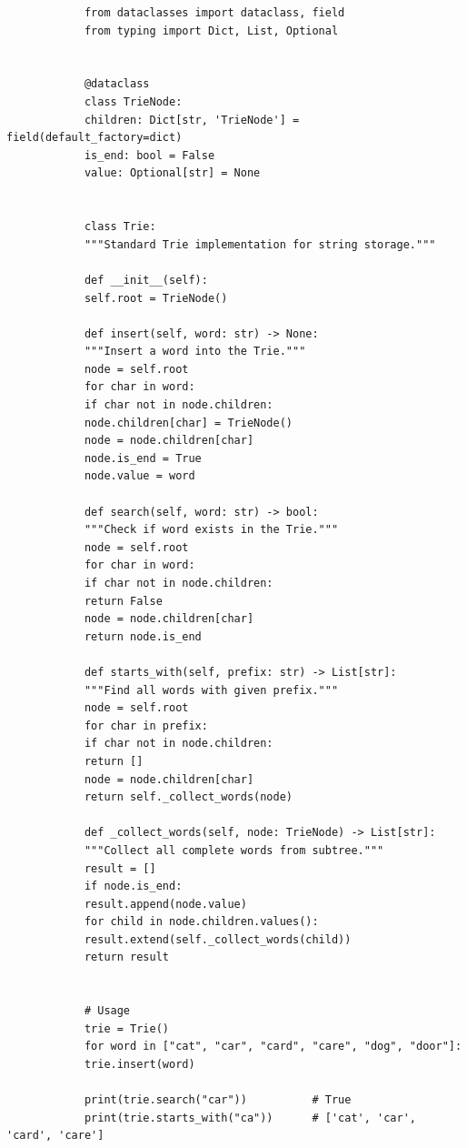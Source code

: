 \documentclass{matinbook}
\begin{document}
    \begin{latin}
        \begin{verbatim}
            from dataclasses import dataclass, field
            from typing import Dict, List, Optional
            
            
            @dataclass
            class TrieNode:
            children: Dict[str, 'TrieNode'] = field(default_factory=dict)
            is_end: bool = False
            value: Optional[str] = None
            
            
            class Trie:
            """Standard Trie implementation for string storage."""
            
            def __init__(self):
            self.root = TrieNode()
            
            def insert(self, word: str) -> None:
            """Insert a word into the Trie."""
            node = self.root
            for char in word:
            if char not in node.children:
            node.children[char] = TrieNode()
            node = node.children[char]
            node.is_end = True
            node.value = word
            
            def search(self, word: str) -> bool:
            """Check if word exists in the Trie."""
            node = self.root
            for char in word:
            if char not in node.children:
            return False
            node = node.children[char]
            return node.is_end
            
            def starts_with(self, prefix: str) -> List[str]:
            """Find all words with given prefix."""
            node = self.root
            for char in prefix:
            if char not in node.children:
            return []
            node = node.children[char]
            return self._collect_words(node)
            
            def _collect_words(self, node: TrieNode) -> List[str]:
            """Collect all complete words from subtree."""
            result = []
            if node.is_end:
            result.append(node.value)
            for child in node.children.values():
            result.extend(self._collect_words(child))
            return result
            
            
            # Usage
            trie = Trie()
            for word in ["cat", "car", "card", "care", "dog", "door"]:
            trie.insert(word)
            
            print(trie.search("car"))          # True
            print(trie.starts_with("ca"))      # ['cat', 'car', 'card', 'care']
        \end{verbatim}
    \end{latin}
    \label{code:trie}
    
\end{document}
